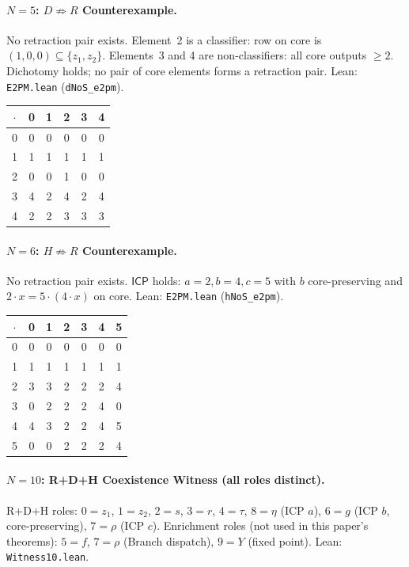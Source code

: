 \documentclass[sigconf,screen,review,anonymous]{acmart}
\newcommand{\dotop}{\cdot}
\newcommand{\ICP}{\textsf{ICP}}
\theoremstyle{remark}
\begin{document}
\paragraph{$N\!=\!5$: $D \not\Rightarrow R$ Counterexample.}
No retraction pair exists. Element~2 is a classifier: row on core is $(1,0,0) \subseteq \{z_1, z_2\}$. Elements~3 and 4 are non-classifiers: all core outputs $\geq 2$. Dichotomy holds; no pair of core elements forms a retraction pair. \quad Lean: \texttt{E2PM.lean} (\texttt{dNoS\_e2pm}).

\medskip
{\small
\begin{tabular}{c|ccccc}
$\dotop$ & 0 & 1 & 2 & 3 & 4 \\\hline
0 & 0 & 0 & 0 & 0 & 0 \\
1 & 1 & 1 & 1 & 1 & 1 \\
2 & 0 & 0 & 1 & 0 & 0 \\
3 & 4 & 2 & 4 & 2 & 4 \\
4 & 2 & 2 & 3 & 3 & 3 \\
\end{tabular}}

\paragraph{$N\!=\!6$: $H \not\Rightarrow R$ Counterexample.}
No retraction pair exists. $\ICP$ holds: $a\!=\!2, b\!=\!4, c\!=\!5$ with $b$ core-preserving and $2 \dotop x = 5 \dotop (4 \dotop x)$ on core. \quad Lean: \texttt{E2PM.lean} (\texttt{hNoS\_e2pm}).

\medskip
{\small
\begin{tabular}{c|cccccc}
$\dotop$ & 0 & 1 & 2 & 3 & 4 & 5 \\\hline
0 & 0 & 0 & 0 & 0 & 0 & 0 \\
1 & 1 & 1 & 1 & 1 & 1 & 1 \\
2 & 3 & 3 & 2 & 2 & 2 & 4 \\
3 & 0 & 2 & 2 & 2 & 4 & 0 \\
4 & 4 & 3 & 2 & 2 & 4 & 5 \\
5 & 0 & 0 & 2 & 2 & 2 & 4 \\
\end{tabular}}

\paragraph{$N\!=\!10$: R+D+H Coexistence Witness (all roles distinct).}
R+D+H roles: $0 = z_1$, $1 = z_2$, $2 = s$, $3 = r$, $4 = \tau$, $8 = \eta$ (ICP $a$), $6 = g$ (ICP $b$, core-preserving), $7 = \rho$ (ICP $c$). Enrichment roles (not used in this paper's theorems): $5 = f$, $7 = \rho$ (Branch dispatch), $9 = Y$ (fixed point). \quad Lean: \texttt{Witness10.lean}.
\end{document}

